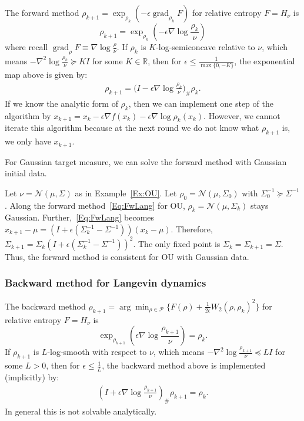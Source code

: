 \documentclass[final,12pt]{colt2018}
\newcommand{\R}{\mathbb{R}}
\newcommand{\N}{\mathcal{N}}
\DeclareMathOperator{\grad}{grad}
\renewcommand{\P}{\mathcal{P}}
\begin{document}
The forward method $\rho_{k+1} = \exp_{\rho_k}(-\epsilon \grad_{\rho_k} F)$ for relative entropy $F = H_\nu$ is
$$\rho_{k+1} = \exp_{\rho_k}\left(-\epsilon \nabla \log \frac{\rho_k}{\nu}\right)$$
where recall $\grad_\rho F \equiv \nabla \log \frac{\rho}{\nu}$.
If $\rho_k$ is $K$-log-semiconcave relative to $\nu$, which means $-\nabla^2 \log \frac{\rho_k}{\nu} \succeq KI$ for some $K \in \R$, then for $\epsilon \le \frac{1}{\max\{0,-K\}}$, the exponential map above is given by:
\begin{align}\label{Eq:FwLang}
\rho_{k+1} = \Big(I - \epsilon \nabla \log \frac{\rho_k}{\nu}\Big)_\# \rho_k.
\end{align}
If we know the analytic form of $\rho_k$, then we can implement one step of the algorithm
by $x_{k+1} = x_k - \epsilon \nabla f(x_k) - \epsilon \nabla \log \rho_k(x_k)$.
However, we cannot iterate this algorithm because at the next round we do not know what $\rho_{k+1}$ is, we only have $x_{k+1}$.

For Gaussian target measure, we can solve the forward method with Gaussian initial data.

\begin{example}
\label{Ex:OUF}
Let $\nu = \N(\mu,\Sigma)$  as in Example~\ref{Ex:OU}.
Let $\rho_0 = \N(\mu,\Sigma_0)$ with $\Sigma_0^{-1} \succeq \Sigma^{-1}$. 
Along the forward method~\eqref{Eq:FwLang} for OU, $\rho_k = \N(\mu,\Sigma_k)$ stays Gaussian. 
Further,~\eqref{Eq:FwLang} becomes $x_{k+1}-\mu = (I+\epsilon(\Sigma_k^{-1}-\Sigma^{-1}))(x_k-\mu)$.
Therefore, $\Sigma_{k+1} = \Sigma_k(I+\epsilon(\Sigma_k^{-1}-\Sigma^{-1}))^2$.
The only fixed point is $\Sigma_k = \Sigma_{k+1} = \Sigma$. 
Thus, the forward method is consistent for OU with Gaussian data.
\end{example}


\subsubsection{Backward method for Langevin dynamics}
\label{Sec:BLang}

The backward method $\rho_{k+1} = \arg\min_{\rho \in \P} \{F(\rho) + \frac{1}{2\epsilon} W_2(\rho,\rho_k)^2\}$ for relative entropy  $F = H_\nu$ is
$$\exp_{\rho_{k+1}}\left(\epsilon \nabla \log \frac{\rho_{k+1}}{\nu}\right) = \rho_k.$$
If $\rho_{k+1}$ is $L$-log-smooth with respect to $\nu$, which means $-\nabla^2 \log \frac{\rho_{k+1}}{\nu} \preceq LI$ for some $L > 0$, then for $\epsilon \le \frac{1}{L}$, the backward method above is implemented (implicitly) by:
\begin{align}\label{Eq:BwLang}
\left(I + \epsilon \nabla \log \frac{\rho_{k+1}}{\nu}\right)_\# \rho_{k+1} = \rho_k.
\end{align}
In general this is not solvable analytically.
\end{document}
